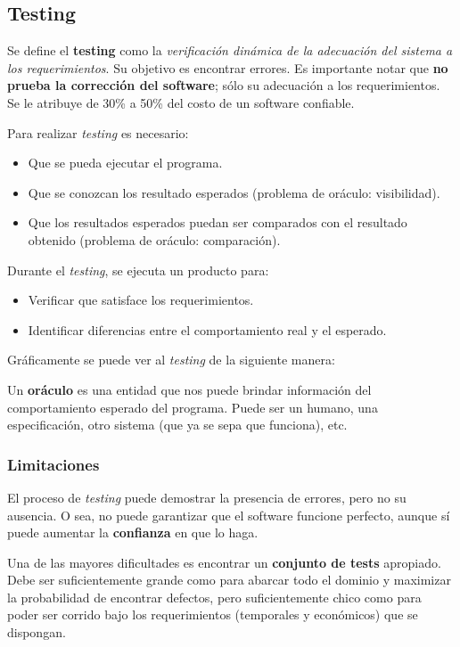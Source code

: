 \documentclass[]{article}
\begin{document}
\subsection{Testing}
Se define el \textbf{testing} como la \textit{verificación dinámica de la adecuación del sistema a los requerimientos}. Su objetivo es encontrar errores. Es importante notar que \textbf{no prueba la corrección del software}; sólo su adecuación a los requerimientos. Se le atribuye de 30\% a 50\% del costo de un software confiable.

Para realizar \textit{testing} es necesario:
\begin{itemize}
	\item Que se pueda ejecutar el programa.
	\item Que se conozcan los resultado esperados (problema de oráculo: visibilidad).
	\item Que los resultados esperados puedan ser comparados con el resultado obtenido (problema de oráculo: comparación).
\end{itemize}

Durante el \textit{testing}, se ejecuta un producto para:
\begin{itemize}
	\item Verificar que satisface los requerimientos.
	\item Identificar diferencias entre el comportamiento real y el esperado.
\end{itemize}

Gráficamente se puede ver al \textit{testing}	 de la siguiente manera:

Un \textbf{oráculo} es una entidad que nos puede brindar información del comportamiento esperado del programa. Puede ser un humano, una especificación, otro sistema (que ya se sepa que funciona), etc.

\subsubsection{Limitaciones}
El proceso de \textit{testing} puede demostrar la presencia de errores, pero no su ausencia. O sea, no puede garantizar que el software funcione perfecto, aunque sí puede aumentar la \textbf{confianza} en que lo haga.

Una de las mayores dificultades es encontrar un \textbf{conjunto de tests} apropiado. Debe ser suficientemente grande como para abarcar todo el dominio y maximizar la probabilidad de encontrar defectos, pero suficientemente chico como para poder ser corrido bajo los requerimientos (temporales y económicos) que se dispongan.
\end{document}
